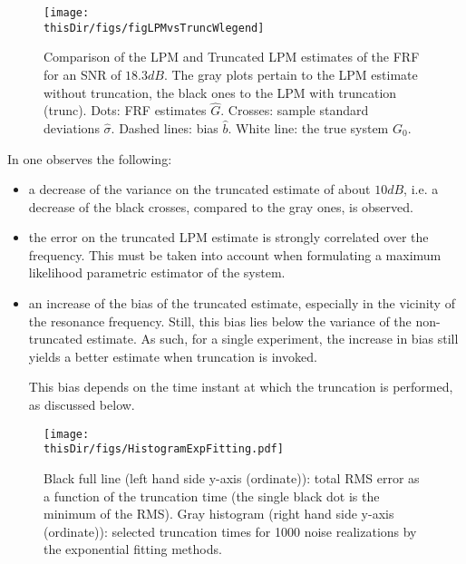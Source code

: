 \begin{figure}[tbh] %
\centering


\texttt{[image: \\thisDir/figs/figLPMvsTruncWlegend]}

\caption{Comparison of the \gls{LPM} and Truncated \gls{LPM} estimates of the \gls{FRF} for an \gls{SNR} of $18.3\unit{dB}$. The gray plots pertain to the \gls{LPM} estimate without truncation, the black ones to the \gls{LPM} with truncation (trunc). Dots: \gls{FRF} estimates $\hat{G}$. Crosses: sample standard deviations $\hat{\sigma}$. Dashed lines: bias $\hat{b}$. White line: the true system $G_0$.}
\label{figLPMvsTrunc}
\end{figure}





In  one observes the following:
\begin{itemize}
\item
a decrease of the variance on the truncated estimate of about $10 \unit{dB}$,  i.e. a decrease of the black crosses, compared to the gray ones, is observed. %

\item 
the error on the truncated \gls{LPM} estimate is strongly correlated over the frequency. This must be taken into account when formulating a maximum likelihood parametric estimator of the system.	

\item
an increase of the bias of the truncated estimate, especially in the vicinity of the resonance frequency. Still, this bias lies below the variance of the non-truncated estimate. As such, for a single experiment, the increase in bias still yields a better estimate when truncation is invoked. 

This bias depends on the time instant at which the truncation is performed, as discussed below.

\end{itemize}

\begin{figure}[htb] %
   \centering



	\texttt{[image: \\thisDir/figs/HistogramExpFitting.pdf]}
 \caption{Black full line (left hand side y-axis (ordinate)): total \gls{RMS} error as a function of the truncation time (the single black dot is the minimum of the \gls{RMS}). Gray histogram (right hand side y-axis (ordinate)): selected truncation times for 1000 noise realizations by the exponential fitting methods.}



   \label{fig:pdfAndRMSeVStruncTime}
\end{figure}

